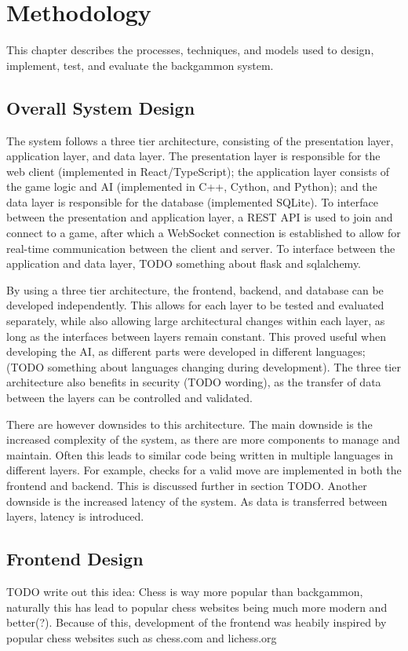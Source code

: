 \chapter{Methodology}

This chapter describes the processes, techniques, and models used to design, implement, test, and evaluate the backgammon system.

\section{Overall System Design}
The system follows a three tier architecture, consisting of the presentation layer, application layer, and data layer. The presentation layer is responsible for the web client (implemented in React/TypeScript); the application layer consists of the game logic and AI (implemented in C++, Cython, and Python); and the data layer is responsible for the database (implemented SQLite). To interface between the presentation and application layer, a REST API is used to join and connect to a game, after which a WebSocket connection is established to allow for real-time communication between the client and server. To interface between the application and data layer, TODO something about flask and sqlalchemy.

By using a three tier architecture, the frontend, backend, and database can be developed independently. This allows for each layer to be tested and evaluated separately, while also allowing large architectural changes within each layer, as long as the interfaces between layers remain constant. This proved useful when developing the AI, as different parts were developed in different languages; (TODO something about languages changing during development). The three tier architecture also benefits in security (TODO wording), as the transfer of data between the layers can be controlled and validated. 

There are however downsides to this architecture. The main downside is the increased complexity of the system, as there are more components to manage and maintain. Often this leads to similar code being written in multiple languages in different layers. For example, checks for a valid move are implemented in both the frontend and backend. This is discussed further in section TODO.  
Another downside is the increased latency of the system. As data is transferred between layers, latency is introduced. 

\section{Frontend Design}
TODO write out this idea: Chess is way more popular than backgammon, naturally this has lead to popular chess websites being much more modern and better(?). Because of this, development of the frontend was heabily inspired by popular chess websites such as chess.com and lichess.org

